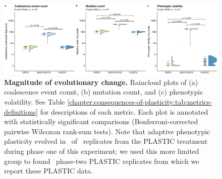 
\begin{figure}[ht!]
    \centering
    \includegraphics[width=1\textwidth]{chapters/03-evolutionary-consequences-of-plasticity/media/evolutionary-change-magnitude-panel.pdf}
    \caption{\small
    \textbf{Magnitude of evolutionary change.}
    Raincloud plots \citep{allen_raincloud_2019} of 
    (a) coalescence event count, 
    (b) mutation count, 
    and (c) phenotypic volatility. 
    See Table \ref{chapter:consequences-of-plasticity:tab:metrics-definitions} for descriptions of each metric.
    Each plot is annotated with statistically significant comparisons (Bonferroni-corrected pairwise Wilcoxon rank-sum tests).
    Note that adaptive phenotypic plasticity evolved in \evolutionaryChangeRatePlasticReps\ of \evolutionaryChangeRateReplicates\ replicates from the PLASTIC treatment during phase one of this experiment; we used this more limited group to found \evolutionaryChangeRatePlasticReps\ phase-two PLASTIC replicates from which we report these PLASTIC data.
    }
    \label{chapter:consequences-of-plasticity:fig:evolutionary-dynamics-magnitude}
\end{figure}